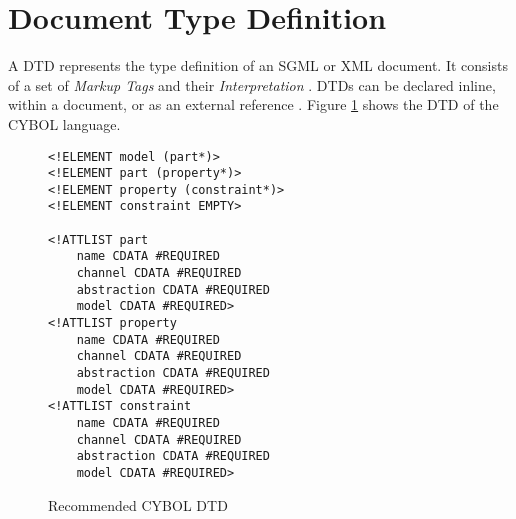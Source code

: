 %
%
%
%
%
%

\section{Document Type Definition}
\label{document_type_definition_heading}

A DTD represents the type definition of an SGML or XML document. It consists of
a set of \emph{Markup Tags} and their \emph{Interpretation} \cite{foldoc}. DTDs
can be declared inline, within a document, or as an external reference
\cite{w3schools}. Figure \ref{dtd_figure} shows the DTD of the CYBOL language.

\begin{figure}[ht]
    \bigskip
    \begin{scriptsize}
        \begin{verbatim}
<!ELEMENT model (part*)>
<!ELEMENT part (property*)>
<!ELEMENT property (constraint*)>
<!ELEMENT constraint EMPTY>

<!ATTLIST part
    name CDATA #REQUIRED
    channel CDATA #REQUIRED
    abstraction CDATA #REQUIRED
    model CDATA #REQUIRED>
<!ATTLIST property
    name CDATA #REQUIRED
    channel CDATA #REQUIRED
    abstraction CDATA #REQUIRED
    model CDATA #REQUIRED>
<!ATTLIST constraint
    name CDATA #REQUIRED
    channel CDATA #REQUIRED
    abstraction CDATA #REQUIRED
    model CDATA #REQUIRED>
        \end{verbatim}
    \end{scriptsize}
    \caption{Recommended CYBOL DTD}
    \label{dtd_figure}
\end{figure}

